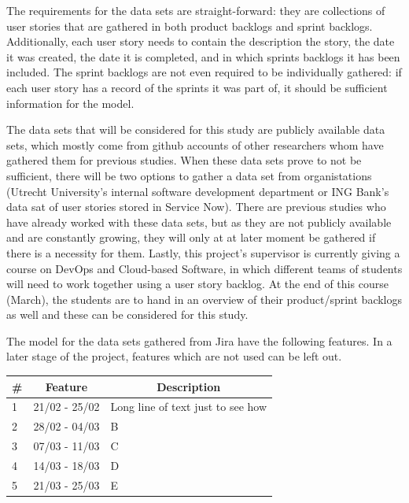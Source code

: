 \documentclass[sigconf]{acmart}
\begin{document}
The requirements for the data sets are straight-forward: they are collections of user stories that are gathered in both product backlogs and sprint backlogs. Additionally, each user story needs to contain the description the story, the date it was created, the date it is completed, and in which sprints backlogs it has been included.
The sprint backlogs are not even required to be individually gathered: if each user story has a record of the sprints it was part of, it should be sufficient information for the model.

The data sets that will be considered for this study are publicly available data sets, which mostly come from github accounts of other researchers whom have gathered them for previous studies. 
When these data sets prove to not be sufficient, there will be two options to gather a data set from organistations (Utrecht University's internal software development department or ING Bank's data sat of user stories stored in Service Now).
There are previous studies who have already worked with these data sets, but as they are not publicly available and are constantly growing, they will only at at later moment be gathered if there is a necessity for them.
Lastly, this project's supervisor is currently giving a course on DevOps and Cloud-based Software, in which different teams of students will need to work together using a user story backlog. At the end of this course (March), the students are to hand in an overview of their product/sprint backlogs as well and these can be considered for this study.

The model for the data sets gathered from Jira have the following features. In a later stage of the project, features which are not used can be left out.

\begin{table}[h]
\begin{tabular}{|lll|}
\hline
\multicolumn{1}{|c}{\#} & \multicolumn{1}{c}{Feature} & \multicolumn{1}{c|}{Description}  \\ \hline
1                       & 21/02 - 25/02               & Long line of text just to see how \\
2                       & 28/02 - 04/03               & B                                 \\
3                       & 07/03 - 11/03               & C                                 \\
4                       & 14/03 - 18/03               & D                                 \\
5                       & 21/03 - 25/03               & E                                 \\ \hline
\end{tabular}
\end{table}
\end{document}

